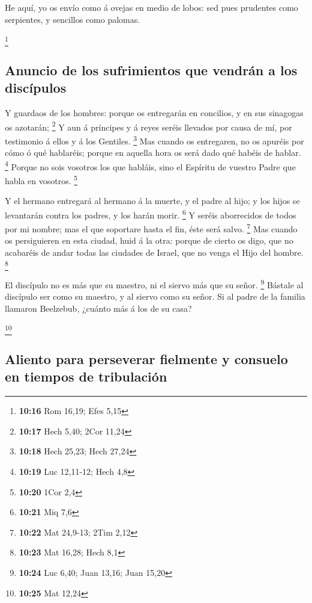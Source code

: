  He aquí, yo os envío como á ovejas en medio de lobos: sed
pues prudentes como serpientes, y sencillos como palomas.

\footnote{\textbf{10:16} Rom 16,19; Efes 5,15}

\hypertarget{anuncio-de-los-sufrimientos-que-vendruxe1n-a-los-discuxedpulos}{%
\subsection{Anuncio de los sufrimientos que vendrán a los
discípulos}\label{anuncio-de-los-sufrimientos-que-vendruxe1n-a-los-discuxedpulos}}

 Y guardaos de los hombres: porque os entregarán en
concilios, y en sus sinagogas os azotarán; \footnote{\textbf{10:17} Hech
  5,40; 2Cor 11,24}  Y aun á príncipes y á reyes seréis
llevados por causa de mí, por testimonio á ellos y á los Gentiles.
\footnote{\textbf{10:18} Hech 25,23; Hech 27,24}  Mas
cuando os entregaren, no os apuréis por cómo ó qué hablaréis; porque en
aquella hora os será dado qué habéis de hablar. \footnote{\textbf{10:19}
  Luc 12,11-12; Hech 4,8}  Porque no sois vosotros los que
habláis, sino el Espíritu de vuestro Padre que habla en vosotros.
\footnote{\textbf{10:20} 1Cor 2,4}

 Y el hermano entregará al hermano á la muerte, y el padre
al hijo; y los hijos se levantarán contra los padres, y los harán morir.
\footnote{\textbf{10:21} Miq 7,6}  Y seréis aborrecidos de
todos por mi nombre; mas el que soportare hasta el fin, éste será salvo.
\footnote{\textbf{10:22} Mat 24,9-13; 2Tim 2,12}  Mas
cuando os persiguieren en esta ciudad, huid á la otra: porque de cierto
os digo, que no acabaréis de andar todas las ciudades de Israel, que no
venga el Hijo del hombre. \footnote{\textbf{10:23} Mat 16,28; Hech 8,1}

 El discípulo no es más que su maestro, ni el siervo más
que su señor. \footnote{\textbf{10:24} Luc 6,40; Juan 13,16; Juan 15,20}
 Bástale al discípulo ser como su maestro, y al siervo como
su señor. Si al padre de la familia llamaron Beelzebub, ¿cuánto más á
los de su casa?

\footnote{\textbf{10:25} Mat 12,24}

\hypertarget{aliento-para-perseverar-fielmente-y-consuelo-en-tiempos-de-tribulaciuxf3n}{%
\subsection{Aliento para perseverar fielmente y consuelo en tiempos de
tribulación}\label{aliento-para-perseverar-fielmente-y-consuelo-en-tiempos-de-tribulaciuxf3n}}

